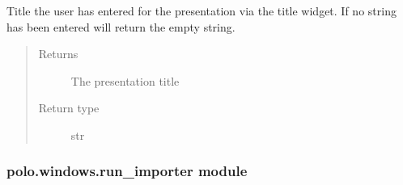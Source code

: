\documentclass[letterpaper,10pt,english]{sphinxmanual}
\begin{document}
\begin{fulllineitems}
\begin{fulllineitems}
\end{fulllineitems}


\begin{fulllineitems}
\label{\detokenize{polo.windows:polo.windows.pptx_dialog.PptxDesignerDialog.title}}
Title the user has entered for the presentation via the title
 widget. If no string has been entered will return the empty
string.
\begin{quote}\begin{description}
\item[{Returns}] \leavevmode
The presentation title

\item[{Return type}] \leavevmode
str

\end{description}\end{quote}

\end{fulllineitems}


\end{fulllineitems}



\subsubsection{polo.windows.run\_importer module}
\label{\detokenize{polo.windows:module-polo.windows.run_importer}}\label{\detokenize{polo.windows:polo-windows-run-importer-module}}
\end{document}
